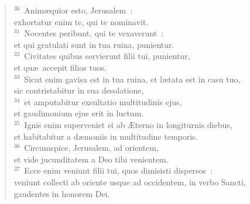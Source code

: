 \begin{verse}${}^{30}$~Anim\ae quior esto, Jerusalem~:\\ exhortatur enim te, qui te nominavit.\\
${}^{31}$~Nocentes peribunt, qui te vexaverunt~:\\ et qui gratulati sunt in tua ruina, punientur.\\
${}^{32}$~Civitates quibus servierunt filii tui, punientur,\\ et qu\ae\ accepit filios tuos.\\
${}^{33}$~Sicut enim gavisa est in tua ruina, et l\ae tata est in casu tuo,\\ sic contristabitur in sua desolatione,\\
${}^{34}$~et amputabitur exsultatio multitudinis ejus,\\ et gaudimonium ejus erit in luctum.\\
${}^{35}$~Ignis enim superveniet ei ab \AE terno in longiturnis diebus,\\ et habitabitur a d\ae moniis in multitudine temporis.\\
${}^{36}$~Circumspice, Jerusalem, ad orientem,\\ et vide jucunditatem a Deo tibi venientem.\\
${}^{37}$~Ecce enim veniunt filii tui, quos dimisisti dispersos~:\\ veniunt collecti ab oriente usque ad occidentem, in verbo Sancti,\\ gaudentes in honorem Dei.\end{verse}


